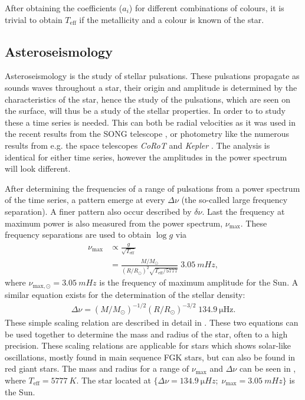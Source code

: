 After obtaining the coefficients ($a_i$) for different combinations of colours, it is trivial to
obtain $T_\mathrm{eff}$ if the metallicity and a colour is known of the star.

\subsection{Asteroseismology}

Asteroseismology is the study of stellar pulsations. These pulsations propagate as sounds waves
throughout a star, their origin and amplitude is determined by the characteristics of the star,
hence the study of the pulsations, which are seen on the surface, will thus be a study of the
stellar properties. In order to to study these a time series is needed. This can both be radial
velocities as it was used in the recent results from the SONG telescope \citep{Grundahl2017}, or
photometry like the numerous results from e.g. the space telescopes \emph{CoRoT} and \emph{Kepler}
\citep[see e.g.][]{Christensen-Dalsgaard2010,Huber2014,Chaplin2011}. The analysis is identical for
either time series, however the amplitudes in the power spectrum will look different.

After determining the frequencies of a range of pulsations from a power spectrum of the time series,
a pattern emerge at every $\Delta\nu$ (the so-called large frequency separation). A finer pattern
also occur described by $\delta\nu$. Last the frequency at maximum power is also measured from the
power spectrum, $\nu_\mathrm{max}$. These frequency separations are used to obtain $\log g$ via
\begin{align}
  \nu_\mathrm{max} &\propto \frac{g}{\sqrt{T_\mathrm{eff}}} \\
                   &= \frac{M/M_\odot}{(R/R_\odot)^2 \sqrt{T_\mathrm{eff}/5777}}\; \SI{3.05}{mHz},\label{eq:scaling1}
\end{align}
where $\nu_{\mathrm{max},\odot}=\SI{3.05}{mHz}$ is the frequency of maximum amplitude for the Sun. A
similar equation exists for the determination of the stellar density:
\begin{align}
  \Delta\nu = (M/M_\odot)^{-1/2} (R/R_\odot)^{-3/2}\; \SI{134.9}{\micro\hertz}.
\end{align}
These simple scaling relation are described in detail in \citet{Kjeldsen1995}. These two equations
can be used together to determine the mass and radius of the star, often to a high precision. These
scaling relations are applicable for stars which shows solar-like oscillations, mostly found in main
sequence FGK stars, but can also be found in red giant stars. The mass and radius for a range of
$\nu_\mathrm{max}$ and $\Delta\nu$ can be seen in , where
$T_\mathrm{eff}=\SI{5777}{K}$. The star located at $\{\Delta\nu=\SI{134.9}{\micro
Hz};\;\nu_\mathrm{max}=\SI{3.05}{mHz}\}$ is the Sun.

